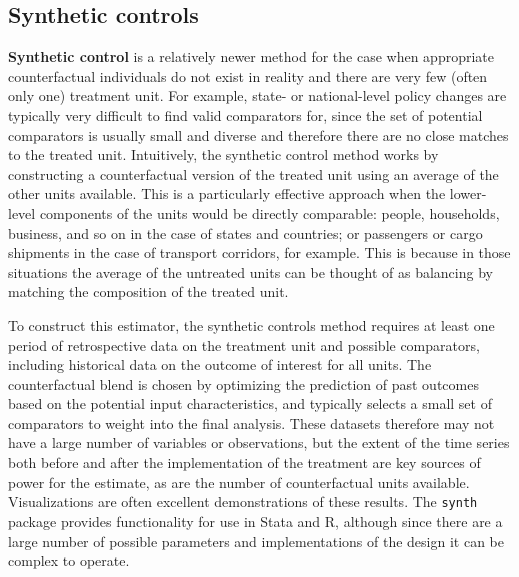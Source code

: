 \subsection{Synthetic controls}

\textbf{Synthetic control} is a relatively newer method
for the case when appropriate counterfactual individuals
do not exist in reality and there are very few (often only one) treatment unit.\cite{abadie2015comparative}
For example, state- or national-level policy changes
are typically very difficult to find valid comparators for,
since the set of potential comparators is usually small and diverse
and therefore there are no close matches to the treated unit.
Intuitively, the synthetic control method works
by constructing a counterfactual version of the treated unit
using an average of the other units available.\cite{abadie2010synthetic}
This is a particularly effective approach
when the lower-level components of the units would be directly comparable:
people, households, business, and so on in the case of states and countries;
or passengers or cargo shipments in the case of transport corridors, for example.\cite{gobillon2016regional}
This is because in those situations the average of the untreated units
can be thought of as balancing by matching the composition of the treated unit.

To construct this estimator, the synthetic controls method requires
at least one period of retrospective data on the treatment unit and possible comparators,
including historical data on the outcome of interest for all units.
The counterfactual blend is chosen by optimizing the prediction of past outcomes
based on the potential input characteristics,
and typically selects a small set of comparators to weight into the final analysis.
These datasets therefore may not have a large number of variables or observations,
but the extent of the time series both before and after the implementation
of the treatment are key sources of power for the estimate,
as are the number of counterfactual units available.
Visualizations are often excellent demonstrations of these results.
The \texttt{synth} package provides functionality for use in Stata and R,
although since there are a large number of possible parameters
and implementations of the design it can be complex to operate.
